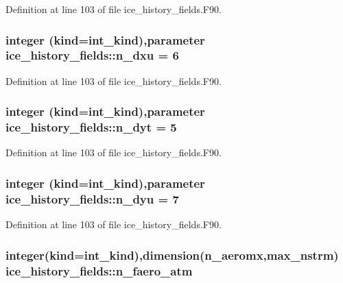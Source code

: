 Definition at line 103 of file ice\_\-history\_\-fields.F90.\hypertarget{namespaceice__history__fields_abf7b5bd4ffe0fce783bbb9305b92e08c}{
\subsubsection[{n\_\-dxu}]{\setlength{\rightskip}{0pt plus 5cm}integer (kind=int\_\-kind),parameter {\bf ice\_\-history\_\-fields::n\_\-dxu} = 6}}
\label{namespaceice__history__fields_abf7b5bd4ffe0fce783bbb9305b92e08c}


Definition at line 103 of file ice\_\-history\_\-fields.F90.\hypertarget{namespaceice__history__fields_a7489b539895f4c90f2ac32cef942834d}{
\subsubsection[{n\_\-dyt}]{\setlength{\rightskip}{0pt plus 5cm}integer (kind=int\_\-kind),parameter {\bf ice\_\-history\_\-fields::n\_\-dyt} = 5}}
\label{namespaceice__history__fields_a7489b539895f4c90f2ac32cef942834d}


Definition at line 103 of file ice\_\-history\_\-fields.F90.\hypertarget{namespaceice__history__fields_ae9ef4bdaa9a78373d8e7a64434e63832}{
\subsubsection[{n\_\-dyu}]{\setlength{\rightskip}{0pt plus 5cm}integer (kind=int\_\-kind),parameter {\bf ice\_\-history\_\-fields::n\_\-dyu} = 7}}
\label{namespaceice__history__fields_ae9ef4bdaa9a78373d8e7a64434e63832}


Definition at line 103 of file ice\_\-history\_\-fields.F90.\hypertarget{namespaceice__history__fields_ac09149d16d9045cc266eff8a26ff0d97}{
\subsubsection[{n\_\-faero\_\-atm}]{\setlength{\rightskip}{0pt plus 5cm}integer(kind=int\_\-kind),dimension(n\_\-aeromx,max\_\-nstrm) {\bf ice\_\-history\_\-fields::n\_\-faero\_\-atm}}}
\label{namespaceice__history__fields_ac09149d16d9045cc266eff8a26ff0d97}


